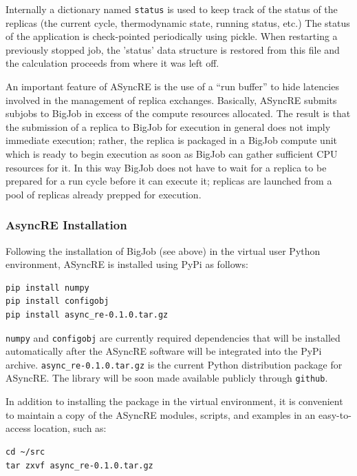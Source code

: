 \documentclass{sig-alternate}
\begin{document}
Internally a dictionary named \verb+status+ is used to keep track of
the status of the replicas (the current cycle, thermodynamic state,
running status, etc.) The status of the application is check-pointed
periodically using pickle. When restarting a previously stopped job,
the 'status' data structure is restored from this file and the
calculation proceeds from where it was left off.

An important feature of ASyncRE is the use of a ``run buffer'' to hide
latencies involved in the management of replica exchanges. Basically,
ASyncRE submits subjobs to BigJob in excess of the compute resources
allocated.  The result is that the submission of a replica
to BigJob for execution in general does not imply immediate execution;
rather, the replica is packaged in a BigJob compute unit which is
ready to begin execution as soon as BigJob can gather sufficient CPU
resources for it. In this way BigJob does not have to wait for a
replica to be prepared for a run cycle before it can execute it;
replicas are launched from a pool of replicas already prepped for
execution.

\subsubsection{AsyncRE Installation}

Following the installation of BigJob (see above) in the virtual user Python environment, ASyncRE is installed using PyPi as follows:

\begin{lstlisting}[frame=single]
pip install numpy
pip install configobj
pip install async_re-0.1.0.tar.gz
\end{lstlisting}

\verb+numpy+ and \verb+configobj+ are currently required dependencies
that will be installed automatically after the ASyncRE software will
be integrated into the PyPi archive. \verb+async_re-0.1.0.tar.gz+ is
the current Python distribution package for ASyncRE. The library will
be soon made available publicly through \verb+github+.

In addition to installing the package in the virtual environment, it
is convenient to maintain a copy of the ASyncRE modules, scripts, and
examples in an easy-to-access location, such as:

\begin{lstlisting}[frame=single]
cd ~/src
tar zxvf async_re-0.1.0.tar.gz
\end{lstlisting}
\end{document}
